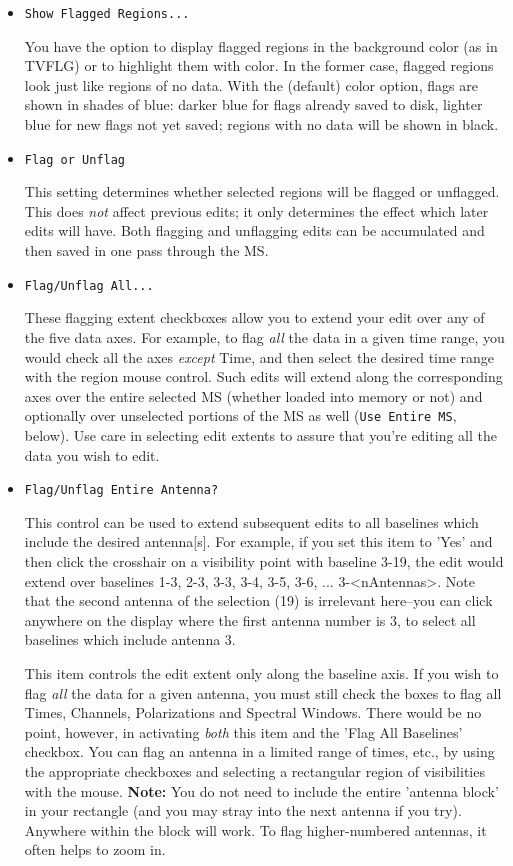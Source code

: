 \begin{itemize}

\item {\tt Show Flagged Regions...}

You have the option to display flagged regions in the background
color (as in TVFLG) or to highlight them with color.
In the former case, flagged regions look just like regions of no
data.  With the (default) color option, flags are shown in shades of blue:
darker blue for flags already saved to disk, lighter blue for
new flags not yet saved; regions with no data will be shown in black.

\item {\tt Flag or Unflag}

This setting determines whether selected regions will be flagged or
unflagged.  This does {\it not} affect previous
edits; it only determines the effect which later edits
will have.  Both flagging and unflagging edits can be accumulated
and then saved in one pass through the MS.

\item {\tt Flag/Unflag All...}

These flagging extent checkboxes allow you to extend your edit over any
of the five data axes.  For example, to flag {\it all} the data in a given
time range, you would check all the axes {\it except} Time, and then
select the desired time range with the region mouse control.  Such edits
will extend along the corresponding axes over the entire selected MS
(whether loaded into memory or not) and optionally over unselected 
portions of the MS as well ({\tt Use Entire MS}, below).  Use care in
selecting edit extents to assure that you're editing all
the data you wish to edit.

\item {\tt Flag/Unflag Entire Antenna?}

This control can be used to extend subsequent edits to all baselines
which include the desired antenna[s].  For example, if you set this item
to 'Yes' and then click the crosshair on a visibility point with
baseline 3-19, the edit would extend over baselines 1-3, 2-3, 3-3, 3-4,
3-5, 3-6, ... 3-<nAntennas>.  Note that the second antenna of the selection
(19) is irrelevant here--you can click anywhere on the display where the
first antenna number is 3, to select all baselines which include antenna 3.

This item controls the edit extent only along the baseline axis.  If you
wish to flag {\it all} the data for a given antenna, you must still check
the boxes to flag all Times, Channels, Polarizations and Spectral Windows.
There would be no point, however, in activating {\it both} this item and
the 'Flag All Baselines' checkbox.  You can flag an antenna in a limited
range of times, etc., by using the appropriate checkboxes and selecting
a rectangular region of visibilities with the mouse. {\bf Note:} You do
not need to include the entire 'antenna block' in your
rectangle (and you may stray into the next antenna if you try). Anywhere
within the block will work.  To flag higher-numbered antennas, it often
helps to zoom in.


\end{itemize}
